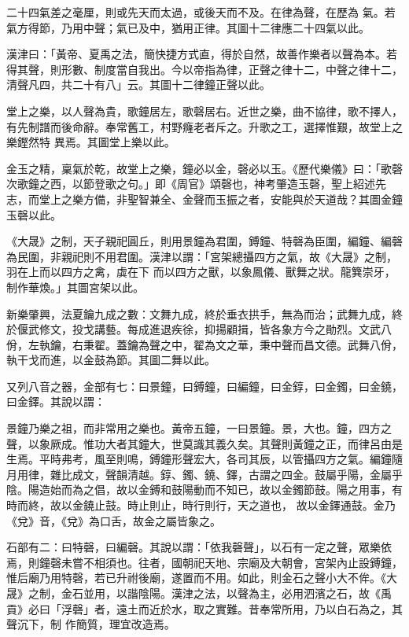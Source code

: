 \begin{pinyinscope}
 二十四氣差之毫厘，則或先天而太過，或後天而不及。在律為聲，在歷為
 氣。若氣方得節，乃用中聲；氣已及中，猶用正律。其圖十二律應二十四氣以此。



 漢津曰：「黃帝、夏禹之法，簡快捷方式直，得於自然，故善作樂者以聲為本。若得其聲，則形數、制度當自我出。今以帝指為律，正聲之律十二，中聲之律十二，清聲凡四，共二十有八」云。其圖十二律鐘正聲以此。



 堂上之樂，以人聲為貴，歌鐘居左，歌磬居右。近世之樂，曲不協律，歌不擇人，有先制譜而後命辭。奉常舊工，村野癃老者斥之。升歌之工，選擇惟艱，故堂上之樂鏗然特
 異焉。其圖堂上樂以此。



 金玉之精，稟氣於乾，故堂上之樂，鐘必以金，磬必以玉。《歷代樂儀》曰：「歌磬次歌鐘之西，以節登歌之句。」即《周官》頌磬也，神考肇造玉磬，聖上紹述先志，而堂上之樂方備，非聖智兼全、金聲而玉振之者，安能與於天道哉？其圖金鐘玉磬以此。



 《大晟》之制，天子親祀圓丘，則用景鐘為君圍，鎛鐘、特磬為臣圍，編鐘、編磬為民圍，非親祀則不用君圍。漢津以謂：「宮架總攝四方之氣，故《大晟》之制，羽在上而以四方之禽，虡在下
 而以四方之獸，以象鳳儀、獸舞之狀。龍簨崇牙，制作華煥。」其圖宮架以此。



 新樂肇興，法夏鑰九成之數：文舞九成，終於垂衣拱手，無為而治；武舞九成，終於偃武修文，投戈講藝。每成進退疾徐，抑揚顧揖，皆各象方今之勛烈。文武八佾，左執鑰，右秉翟。蓋鑰為聲之中，翟為文之華，秉中聲而昌文德。武舞八佾，執干戈而進，以金鼓為節。其圖二舞以此。



 又列八音之器，金部有七：曰景鐘，曰鎛鐘，曰編鐘，曰金錞，曰金鐲，曰金鐃，曰金鐸。其說以謂：



 景鐘乃樂之祖，而非常用之樂也。黃帝五鐘，一曰景鐘。景，大也。鐘，四方之聲，以象厥成。惟功大者其鐘大，世莫識其義久矣。其聲則黃鐘之正，而律呂由是生焉。平時弗考，風至則鳴，鎛鐘形聲宏大，各司其辰，以管攝四方之氣。編鐘隨月用律，雜比成文，聲韻清越。錞、鐲、鐃、鐸，古謂之四金。鼓屬乎陽，金屬乎陰。陽造始而為之倡，故以金鎛和鼓陽動而不知已，故以金鐲節鼓。陽之用事，有時而終，故以金鐃止鼓。時止則止，時行則行，天之道也，
 故以金鐸通鼓。金乃《兌》音，《兌》為口舌，故金之屬皆象之。



 石部有二：曰特磬，曰編磬。其說以謂：「依我磬聲」，以石有一定之聲，眾樂依焉，則鐘磬未嘗不相須也。往者，國朝祀天地、宗廟及大朝會，宮架內止設鎛鐘，惟后廟乃用特磬，若已升祔後廟，遂置而不用。如此，則金石之聲小大不侔。《大晟》之制，金石並用，以諧陰陽。漢津之法，以聲為主，必用泗濱之石，故《禹貢》必曰「浮磬」者，遠土而近於水，取之實難。昔奉常所用，乃以白石為之，其聲沉下，制
 作簡質，理宜改造焉。




\end{pinyinscope}
